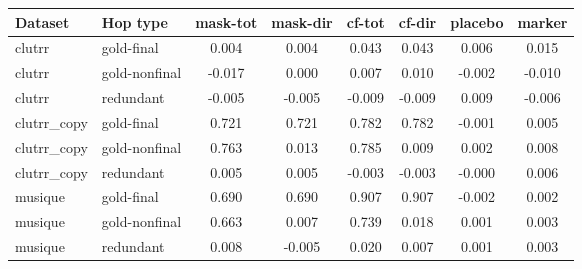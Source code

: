 \begin{tabular}{llcccccc}
\toprule
Dataset & Hop type & mask-tot & mask-dir & cf-tot & cf-dir & placebo & marker \\
\midrule
clutrr & gold-final & 0.004 & 0.004 & 0.043 & 0.043 & 0.006 & 0.015 \\
clutrr & gold-nonfinal & -0.017 & 0.000 & 0.007 & 0.010 & -0.002 & -0.010 \\
clutrr & redundant & -0.005 & -0.005 & -0.009 & -0.009 & 0.009 & -0.006 \\
clutrr\_copy & gold-final & 0.721 & 0.721 & 0.782 & 0.782 & -0.001 & 0.005 \\
clutrr\_copy & gold-nonfinal & 0.763 & 0.013 & 0.785 & 0.009 & 0.002 & 0.008 \\
clutrr\_copy & redundant & 0.005 & 0.005 & -0.003 & -0.003 & -0.000 & 0.006 \\
musique & gold-final & 0.690 & 0.690 & 0.907 & 0.907 & -0.002 & 0.002 \\
musique & gold-nonfinal & 0.663 & 0.007 & 0.739 & 0.018 & 0.001 & 0.003 \\
musique & redundant & 0.008 & -0.005 & 0.020 & 0.007 & 0.001 & 0.003 \\
\bottomrule
\end{tabular}
